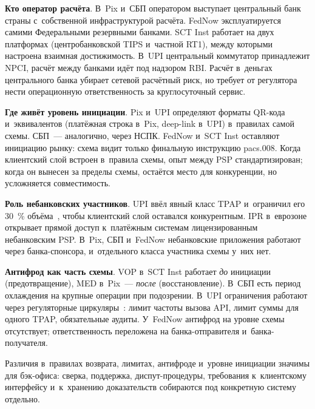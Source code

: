 \textbf{Кто оператор расчёта}. В~Pix и~СБП оператором выступает
центральный банк страны с~собственной инфраструктурой расчёта.
FedNow эксплуатируется самими Федеральными резервными банками. SCT Inst работает
на двух платформах (центробанковской TIPS и~частной RT1), между
которыми настроена взаимная достижимость. В~UPI центральный коммутатор
принадлежит NPCI, расчёт между банками идёт под надзором RBI. Расчёт в~деньгах центрального банка убирает сетевой расчётный
риск, но требует от регулятора нести операционную ответственность
за круглосуточный сервис.

\textbf{Где живёт уровень инициации}. Pix и~UPI определяют форматы
QR-кода и~эквивалентов (платёжная строка в~Pix, deep-link в~UPI)
в~правилах самой схемы. СБП~--- аналогично, через НСПК. FedNow и~SCT Inst оставляют
инициацию рынку: схема видит только финальную инструкцию pacs.008.
Когда клиентский слой встроен в~правила схемы, опыт между PSP
стандартизирован; когда он вынесен за пределы схемы, остаётся место
для конкуренции, но усложняется совместимость.

\textbf{Роль небанковских участников}. UPI ввёл явный класс TPAP
и~ограничил его 30~\% объёма~\cite{npci-upi-tpap-cap}, чтобы клиентский
слой оставался конкурентным. IPR в~еврозоне открывает прямой доступ
к~платёжным системам лицензированным небанковским PSP. В~Pix, СБП
и~FedNow небанковские приложения работают через банка-спонсора,
и~отдельного класса участника схемы у~них нет.

\textbf{Антифрод как часть схемы}. VOP в~SCT Inst работает \emph{до}
инициации (предотвращение), MED в~Pix~--- \emph{после} (восстановление).
В~СБП есть период охлаждения на крупные операции при подозрении. В~UPI ограничения работают через регуляторные
циркуляры~\cite{npci-upi-oc-215}: лимит частоты вызова API, лимит
суммы для одного TPAP, обязательные аудиты. У~FedNow антифрод на уровне схемы отсутствует;
ответственность переложена на банка-отправителя и~банка-получателя.

Различия в~правилах возврата, лимитах, антифроде и~уровне
инициации значимы для бэк-офиса: сверка, поддержка, диспут-процедуры,
требования к~клиентскому интерфейсу и~к~хранению доказательств
собираются под конкретную систему отдельно.
